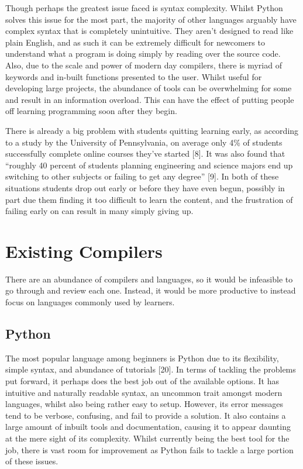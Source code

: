 \documentclass[
]{report}
\begin{document}
Though perhaps the greatest issue faced is syntax complexity. Whilst
Python solves this issue for the most part, the majority of other
languages arguably have complex syntax that is completely unintuitive.
They aren't designed to read like plain English, and as such it can be
extremely difficult for newcomers to understand what a program is doing
simply by reading over the source code. Also, due to the scale and power
of modern day compilers, there is myriad of keywords and in-built
functions presented to the user. Whilst useful for developing large
projects, the abundance of tools can be overwhelming for some and result
in an information overload. This can have the effect of putting people
off learning programming soon after they begin.

There is already a big problem with students quitting learning early, as
according to a study by the University of Pennsylvania, on average only
4\% of students successfully complete online courses they've started
{[}8{]}. It was also found that ``roughly 40 percent of students
planning engineering and science majors end up switching to other
subjects or failing to get any degree'' {[}9{]}. In both of these
situations students drop out early or before they have even begun,
possibly in part due them finding it too difficult to learn the
content, and the frustration of failing early on can result in many
simply giving up.

\section{Existing Compilers}
There are an abundance of compilers and languages, so it would be
infeasible to go through and review each one. Instead, it would be more
productive to instead focus on languages commonly used by learners.

\subsection{Python}
The most popular language among beginners is Python due to its
flexibility, simple syntax, and abundance of tutorials {[}20{]}. In
terms of tackling the problems put forward, it perhaps does the best job
out of the available options. It has intuitive and naturally readable
syntax, an uncommon trait amongst modern languages, whilst also being
rather easy to setup. However, its error messages tend to be verbose,
confusing, and fail to provide a solution. It also contains a large
amount of inbuilt tools and documentation, causing it to appear daunting
at the mere sight of its complexity. Whilst currently being the best
tool for the job, there is vast room for improvement as Python fails to
tackle a large portion of these issues.
\end{document}
